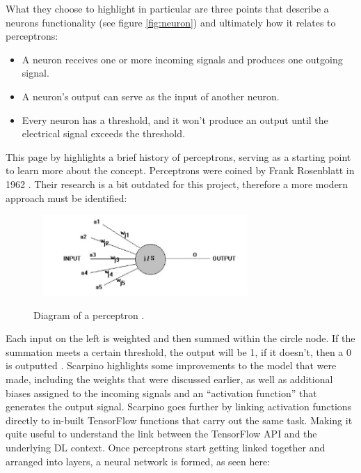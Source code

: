 \documentclass[12pt,a4paper]{report}
\begin{document}
\break

What they choose to highlight in particular are three points that describe a neurons functionality (see figure \ref{fig:neuron})
and ultimately how 
it relates to perceptrons:

\begin{itemize}
    \item A neuron receives one or more incoming signals and produces one outgoing signal.
    \item A neuron's output can serve as the input of another neuron.
    \item Every neuron has a threshold, and it won't produce an output until the electrical signal
     exceeds the threshold.
\end{itemize}

This page by \citet{anonpercep} highlights a brief history of perceptrons,
serving as a starting point to learn more about the concept. Perceptrons were coined by Frank Rosenblatt in 1962  
\citep{rosenblatt1961principles}. Their research is a bit outdated for this project, therefore a more modern approach
must be identified:

\begin{figure}[h]\
    \centering
    \includegraphics[width=0.7\textwidth]{perceptron.jpg}
    \caption{Diagram of a perceptron \citep{anonpercep}.}
\end{figure}

Each input on the left is weighted and then summed within the circle node. If the summation meets a certain threshold, 
the output will be 1, if it doesn't, then a 0 is outputted \citep{ScarpinoMatthew2018Tfd}. 
Scarpino highlights some 
improvements to the model that were made, including the weights that were discussed earlier, as well as additional biases 
assigned to the incoming signals and an “activation function” that generates the output signal. Scarpino goes further 
by linking activation functions directly to in-built TensorFlow functions that carry out the same task. Making it 
quite useful to understand the link between the TensorFlow API and the underlying DL context. Once 
perceptrons start getting linked together and arranged into layers, a neural network is formed, as seen here:
\end{document}
